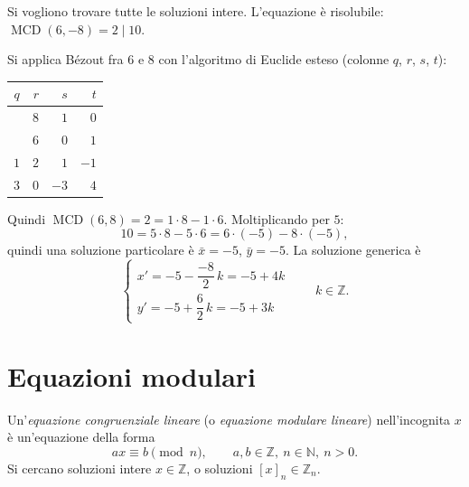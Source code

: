 \documentclass[11pt,a4paper]{article}
\begin{document}
\begin{esempio}[$6x - 8y = 10$]
Si vogliono trovare tutte le soluzioni intere. L'equazione è risolubile: $\operatorname{MCD}(6, -8) = 2 \mid 10$.

Si applica Bézout fra $6$ e $8$ con l'algoritmo di Euclide esteso (colonne $q$, $r$, $s$, $t$):
\begin{center}
\begin{tabular}{c|r|r|r}
$q$ & $r$ & $s$ & $t$ \\
\midrule
 & $8$ & $1$ & $0$ \\
 & $6$ & $0$ & $1$ \\
$1$ & $2$ & $1$ & $-1$ \\
$3$ & $0$ & $-3$ & $4$ \\
\end{tabular}
\end{center}
Quindi $\operatorname{MCD}(6, 8) = 2 = 1\cdot 8 - 1\cdot 6$. Moltiplicando per $5$:
\[
  10 = 5\cdot 8 - 5\cdot 6 = 6\cdot(-5) - 8\cdot(-5),
\]
quindi una soluzione particolare è $\bar{x} = -5$, $\bar{y} = -5$. La soluzione generica è
\[
  \begin{cases} x' = -5 - \dfrac{-8}{2}\,k = -5 + 4k \\[2mm] y' = -5 + \dfrac{6}{2}\,k = -5 + 3k \end{cases} \qquad k \in \mathbb{Z}.
\]
\end{esempio}

\section{Equazioni modulari}

\begin{definizione}
Un'\emph{equazione congruenziale lineare} (o \emph{equazione modulare lineare}) nell'incognita $x$ è un'equazione della forma
\[
  ax \equiv b \pmod n, \qquad a, b \in \mathbb{Z},\ n \in \mathbb{N},\ n > 0.
\]
Si cercano soluzioni intere $x \in \mathbb{Z}$, o soluzioni $[x]_n \in \mathbb{Z}_n$.
\end{definizione}
\end{document}
